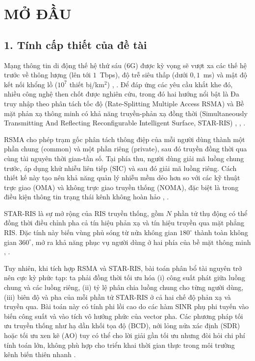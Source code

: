 \chapter*{MỞ ĐẦU}

\section*{1. Tính cấp thiết của đề tài}

Mạng thông tin di động thế hệ thứ sáu (6G) được kỳ vọng sẽ vượt xa các thế
hệ trước về thông lượng (lên tới $1$~Tbps), độ trễ siêu thấp (dưới
$0{,}1$~ms) và mật độ kết nối khổng lồ ($10^7$ thiết bị/km$^2$)
\cite{saad2020vision6g}, \cite{tataria20216g}. Để đáp ứng các yêu cầu khắt khe đó,
nhiều công nghệ then chốt được nghiên cứu, trong đó hai hướng nổi bật là
Đa truy nhập theo phân tách tốc độ (Rate-Splitting Multiple Access
RSMA) và Bề mặt phản xạ thông minh có khả năng truyền-phản xạ đồng thời
(Simultaneously Transmitting And Reflecting Reconfigurable Intelligent
Surface, STAR-RIS) \cite{mao2022rsma}, \cite{liu2021starris}, \cite{mu2022simultaneously}.

RSMA cho phép trạm gốc phân tách thông điệp của mỗi người dùng thành một
phần chung (common) và một phần riêng (private), sau đó truyền
đồng thời qua cùng tài nguyên thời gian-tần số. Tại phía thu, người dùng
giải mã luồng chung trước, áp dụng khử nhiễu liên tiếp (SIC) và sau đó giải
mã luồng riêng. Cách thiết kế này tạo nên khả năng quản lý nhiễu mềm dẻo
hơn so với các kỹ thuật trực giao (OMA) và không trực giao truyền thống
(NOMA), đặc biệt là trong điều kiện thông tin trạng thái kênh không hoàn
hảo \cite{mao2018rsma}, \cite{mao2022rsma}.

STAR-RIS là sự mở rộng của RIS truyền thống, gồm $N$ phần tử thụ động có thể
đồng thời điều chỉnh pha cả tín hiệu phản xạ và tín hiệu truyền qua
mặt phẳng RIS. Đặc tính này biến vùng phủ sóng từ nửa không gian
$180^\circ$ thành toàn không gian $360^\circ$, mở ra khả năng phục vụ
người dùng ở hai phía của bề mặt thông minh \cite{liu2021starris}, \cite{mu2022simultaneously}.

Tuy nhiên, khi tích hợp RSMA và STAR-RIS, bài toán phân bổ tài nguyên
trở nên cực kỳ phức tạp: ta phải đồng thời tối ưu hóa (i) công suất phát
giữa luồng chung và các luồng riêng, (ii) tỷ lệ phân chia luồng chung cho
từng người dùng, (iii) biên độ và pha của mỗi phần tử STAR-RIS ở cả hai
chế độ phản xạ và truyền qua. Bài toán này có tính phi lồi cao do các
hàm SINR phụ phi tuyến vào biến công suất và vào tích vô hướng phức của
vector pha. Các phương pháp tối ưu truyền thống như hạ dần khối tọa độ
(BCD), nới lỏng nửa xác định (SDR) hoặc tối ưu xen kẽ (AO) tuy có thể
cho lời giải gần tối ưu nhưng đòi hỏi chi phí tính toán lớn, không phù
hợp cho triển khai thời gian thực trong môi trường kênh biến thiên nhanh
\cite{wu2020smart}.

